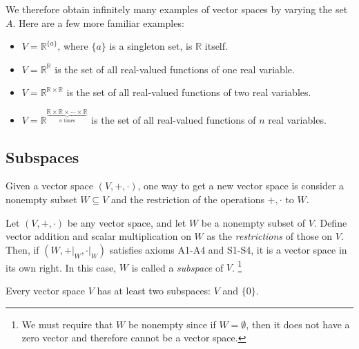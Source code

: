 \documentclass[12pt,letterpaper,reqno]{article}
\numberwithin{equation}{section}
\begin{document}
We therefore obtain infinitely many examples of vector spaces by varying the set $A$. Here are a few more familiar examples:

\begin{itemize}
	\item $V=\mathbb{R}^{\{a\}}$, where $\{a\}$ is a singleton set, is $\mathbb{R}$ itself.
	\item $V=\mathbb{R}^{\mathbb{R}}$ is the set of all real-valued functions of one real variable.
	\item $V=\mathbb{R}^{\mathbb{R} \times \mathbb{R}}$ is the set of all real-valued functions of two real variables.
	\item $V=\mathbb{R}^{\underbrace{\mathbb{R} \times \mathbb{R} \times \cdots \times \mathbb{R}}_{\text{$n$ times}}}$ is the set of all real-valued functions of $n$ real variables.
\end{itemize}

\subsection{Subspaces}
Given a vector space $(V,+,\cdot)$, one way to get a new vector space is consider a nonempty subset $W \subseteq V$ and the restriction of the operations $+,\cdot$ to $W$.
 
\begin{defn}[Subspace]\label{def:subspace}
 Let $(V,+,\cdot)$ be any vector space, and let $W$ be a nonempty subset of $V$. Define vector addition and scalar multiplication on $W$ as the \emph{restrictions} of those on $V$.
Then, if $(W,+\vert_W, \cdot \vert_W)$ satisfies axioms A1-A4 and S1-S4, it is a vector space in its own right. In this case, $W$ is called a \emph{subspace} of $V$. \footnote{We must require that $W$ be nonempty since if $W=\emptyset$, then it does not have a zero vector and therefore cannot be a vector space.}	
\end{defn}

\begin{prop}\label{prop:trivial_subspaces}
	Every vector space $V$ has at least two subspaces: $V$ and $\{0\}$.
\end{prop}
\end{document}
